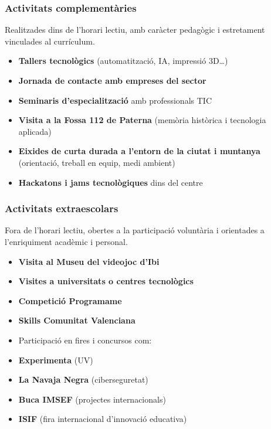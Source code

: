 \documentclass[
  paper=a4,
  ,captions=tableheading
]{scrartcl}
\providecommand{\tightlist}{%
  \setlength{\itemsep}{0pt}\setlength{\parskip}{0pt}}
\begin{document}
\hypertarget{activitats-complementuxe0ries}{%
\subsubsection{Activitats
complementàries}\label{activitats-complementuxe0ries}}

Realitzades dins de l'horari lectiu, amb caràcter pedagògic i
estretament vinculades al currículum.

\begin{itemize}
\tightlist
\item
  \textbf{Tallers tecnològics} (automatització, IA, impressió 3D\ldots)
\item
  \textbf{Jornada de contacte amb empreses del sector}
\item
  \textbf{Seminaris d'especialització} amb professionals TIC
\item
  \textbf{Visita a la Fossa 112 de Paterna} (memòria històrica i
  tecnologia aplicada)
\item
  \textbf{Eixides de curta durada a l'entorn de la ciutat i muntanya}
  (orientació, treball en equip, medi ambient)
\item
  \textbf{Hackatons i jams tecnològiques} dins del centre
\end{itemize}

\hypertarget{activitats-extraescolars}{%
\subsubsection{Activitats
extraescolars}\label{activitats-extraescolars}}

Fora de l'horari lectiu, obertes a la participació voluntària i
orientades a l'enriquiment acadèmic i personal.

\begin{itemize}
\tightlist
\item
  \textbf{Visita al Museu del videojoc d'Ibi}
\item
  \textbf{Visites a universitats o centres tecnològics}
\item
  \textbf{Competició Programame}
\item
  \textbf{Skills Comunitat Valenciana}
\item
  Participació en fires i concursos com:
\item
  \textbf{Experimenta} (UV)
\item
  \textbf{La Navaja Negra} (ciberseguretat)
\item
  \textbf{Buca IMSEF} (projectes internacionals)
\item
  \textbf{ISIF} (fira internacional d'innovació educativa)
\end{itemize}
\end{document}
